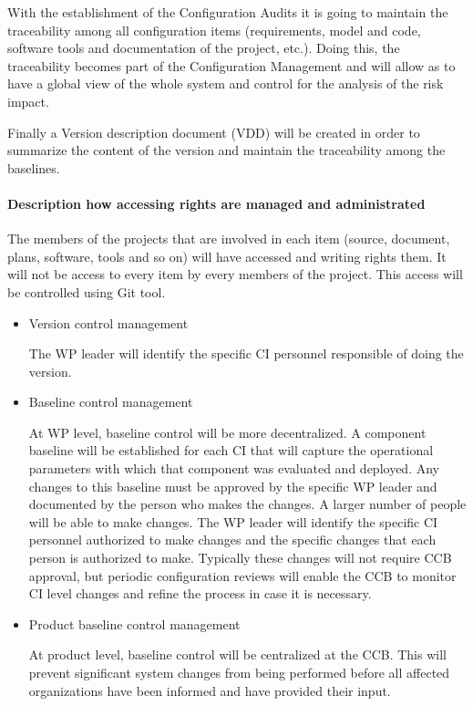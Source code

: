\documentclass{template/openetcs_article}
\begin{document}
With the establishment of the Configuration Audits it is going to maintain the traceability among all configuration items (requirements, model and code, software tools and documentation of the project, etc.). Doing this, the traceability becomes part of the Configuration Management and will allow as to have a global view of the whole system and control for the analysis of the risk impact.



Finally a Version description document (VDD) will be created in order to summarize the content of the version and maintain the traceability among the baselines.


\paragraph{Description how accessing rights are managed and administrated}

The members of the projects that are involved in each item (source, document, plans, software, tools and so on) will have accessed and writing rights them. It will not be access to every item by every members of the project. This access will be controlled using Git tool.

\begin{itemize}
\item Version control management

The WP leader will identify the specific CI personnel responsible of doing the version.

\item Baseline control management

At WP level, baseline control will be more decentralized. A component baseline will be established for each CI that will capture the operational parameters with which that component was evaluated and deployed.  Any changes to this baseline must be approved by the specific WP leader and documented by the person who makes the changes. A larger number of people will be able to make changes. The WP leader will identify the specific CI personnel authorized to make changes and the specific changes that each person is authorized to make. Typically these changes will not require CCB approval, but periodic configuration reviews will enable the CCB to monitor CI level changes and refine the process in case it is necessary.


\item Product baseline control management

At product level, baseline control will be centralized at the CCB. This will prevent significant system changes from being performed before all affected organizations have been informed and have provided their input.
\end{itemize}
\end{document}
